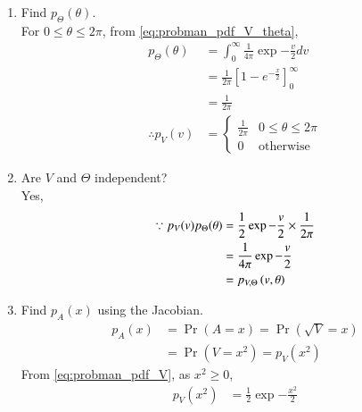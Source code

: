 \begin{enumerate}[label=\thesubsection.\arabic*.,ref=\thesubsection.\theenumi]
\item
Find $p_{\Theta}(\theta)$.  
\\
\solution For $0 \le \theta \le 2\pi$, from \eqref{eq:probman_pdf_V_theta},
\begin{align}
p_{\Theta}(\theta) &= \int_{0}^{\infty} \frac{1}{4\pi}\exp{-\frac{v}{2}} d v \\
&= \frac{1}{2\pi} \left[1 - e^{-\frac{x}{2}} \right]_{0}^{\infty}\\
&= \frac{1}{2\pi}\\
\therefore p_{V}(v) &= 
\begin{cases}
\frac{1}{2\pi} & 0 \leq \theta \leq 2\pi \\
0 & \text{otherwise}
\end{cases}
\end{align}
%
\item
Are $V$ and $\Theta$ independent?
\\
\solution Yes,
\begin{align}
\because p_{V}(v)p_{\Theta}(\theta) &= \frac{1}{2}\exp{-\frac{v}{2}} \times \frac{1}{2\pi}\\
&= \frac{1}{4\pi}\exp{-\frac{v}{2}}\\
&= p_{V,\Theta}\left(v,\theta\right)
\end{align}
\item
Find $p_{A}(x)$ using the Jacobian.
\\
\solution 
\begin{align}
p_{A}(x) &= \Pr(A=x) = \Pr(\sqrt{V} = x) \\
&= \Pr(V=x^2) = p_V(x^2)
\end{align}
From \eqref{eq:probman_pdf_V}, as $x^2 \ge 0$,
\begin{align}
p_{V}(x^2) &= \frac{1}{2}\exp{-\frac{x^2}{2}} 
\end{align}
%
%

%
%
%
\end{enumerate}
